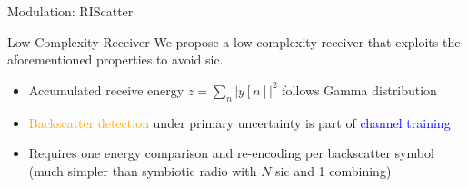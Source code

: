 \documentclass[presentation,xcolor={table},9pt]{beamer}
\begin{document}
\begin{section}{Modulation: RIScatter}
	\begin{frame}{Low-Complexity Receiver}
		We propose a low-complexity receiver that exploits the aforementioned properties to avoid \gls{sic}.
		\begin{figure}[!t]
			\centering
			\subfloat{
				\resizebox{0.42\linewidth}{!}{
					
				}
			}
			\subfloat{
				\resizebox{0.58\linewidth}{!}{
					
				}
			}
			\label{fg:receiver}
		\end{figure}
		\vspace{0.5cm}
		\begin{itemize}
			\item Accumulated receive energy $z=\sum_{n} \bigl\lvert y[n] \bigr\rvert^2$ follows Gamma distribution
			\item \textcolor{orange}{Backscatter detection} under primary uncertainty is part of \textcolor{blue}{channel training}
			\item Requires one energy comparison and re-encoding per backscatter symbol (much simpler than symbiotic radio with $N$ \gls{sic} and 1 combining)
		\end{itemize}
	\end{frame}



\end{section}
\end{document}
